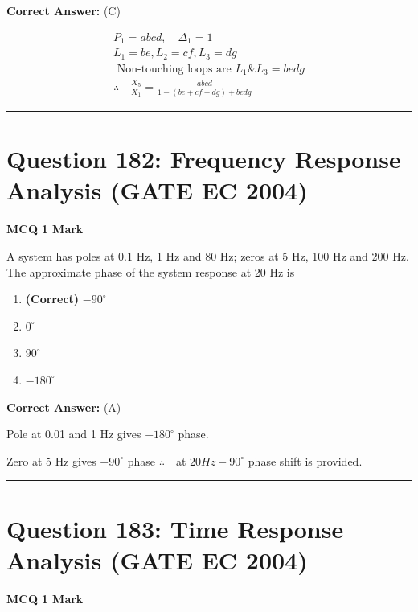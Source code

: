 \documentclass[11pt,a4paper]{article}
\begin{document}
\noindent \textbf{Correct Answer:} (C)

\begin{tcolorbox}[solbox, title=Detailed Solution -- Question 181]
\[
\begin{array}{l} P_{1}=a b c d, \quad \Delta_{1}=1 \\ L_{1}=b e, L_{2}=c f, L_{3}=d g \\ \text { Non-touching loops are } L_{1} \& L_{3}=b e d g \\ \therefore \quad \frac{X_{5}}{X_{1}}=\frac{a b c d}{1-(b e+c f+d g)+b e d g} \end{array}
\]
\end{tcolorbox}

\vspace{1.5em}
\hrule
\vspace{1.5em}

\section*{Question 182: Frequency Response Analysis (GATE EC 2004)}
\noindent \textbf{\color{primary}MCQ} \hfill \textbf{\color{secondary}1 Mark}


\noindent A system has poles at 0.1 Hz, 1 Hz and 80 Hz; zeros at 5 Hz, 100 Hz and 200
Hz. The approximate phase of the system response at 20 Hz is


\begin{enumerate}[label=(\Alph*)]
    \item \textbf{(Correct)} $-90^{\circ}$
    \item $0^{\circ}$
    \item $90^{\circ}$
    \item $-180^{\circ}$
\end{enumerate}

\noindent \textbf{Correct Answer:} (A)

\begin{tcolorbox}[solbox, title=Detailed Solution -- Question 182]
Pole at 0.01 and 1 Hz gives $-180^{\circ}$ phase.

Zero at 5 Hz gives $+90^{\circ}$ phase
$\therefore \quad$at $20Hz-90^{\circ}$ phase shift is provided.
\end{tcolorbox}

\vspace{1.5em}
\hrule
\vspace{1.5em}

\section*{Question 183: Time Response Analysis (GATE EC 2004)}
\noindent \textbf{\color{primary}MCQ} \hfill \textbf{\color{secondary}1 Mark}
\end{document}
